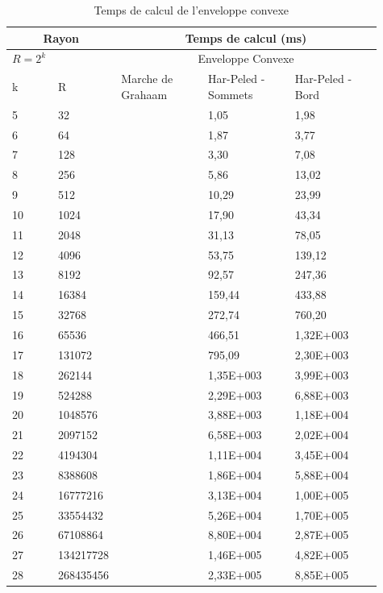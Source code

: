 \begin{table}[h!]
  \begin{tabular}{|p{0.09\linewidth}|p{0.13\linewidth}||p{0.23\linewidth}|p{0.23\linewidth}|p{0.23\linewidth}|}
    \hline
    \multicolumn{2}{|c||}{Rayon} & \multicolumn{3}{c|}{Temps de calcul (ms) } \\  \hline 
    $R=2^k$  &  &  \multicolumn{3}{c|}{Enveloppe Convexe}  \\ \hline
    k & R & Marche de Grahaam & Har-Peled - Sommets & Har-Peled - Bord \\
    \hline
    5 & 32 &  & 1,05 & 1,98\\
    6 & 64 &  & 1,87 & 3,77\\
    7 & 128 &  & 3,30 & 7,08\\
    8 & 256 &  & 5,86 & 13,02\\
    9 & 512 &  & 10,29 & 23,99\\
    10 & 1024 &  & 17,90 & 43,34\\
    11 & 2048 &  & 31,13 & 78,05\\
    12 & 4096 &  & 53,75 & 139,12\\
    13 & 8192 &  & 92,57 & 247,36\\
    14 & 16384 &  & 159,44 & 433,88\\
    15 & 32768 &  & 272,74 & 760,20\\
    16 & 65536 &  & 466,51 & 1,32E+003\\
    17 & 131072 &  & 795,09 & 2,30E+003\\
    18 & 262144 &  & 1,35E+003 & 3,99E+003\\
    19 & 524288 &  & 2,29E+003 & 6,88E+003\\
    20 & 1048576 &  & 3,88E+003 & 1,18E+004\\
    21 & 2097152 &  & 6,58E+003 & 2,02E+004\\
    22 & 4194304 &  & 1,11E+004 & 3,45E+004\\
    23 & 8388608 &  & 1,86E+004 & 5,88E+004\\
    24 & 16777216 &  & 3,13E+004 & 1,00E+005\\
    25 & 33554432 &  & 5,26E+004 & 1,70E+005\\
    26 & 67108864 &  & 8,80E+004 & 2,87E+005\\
    27 & 134217728 &  & 1,46E+005 & 4,82E+005\\
    28 & 268435456 &  & 2,33E+005 & 8,85E+005\\
    \hline
  \end{tabular} 
  \caption{Temps de calcul de l'enveloppe convexe}
\end{table}




